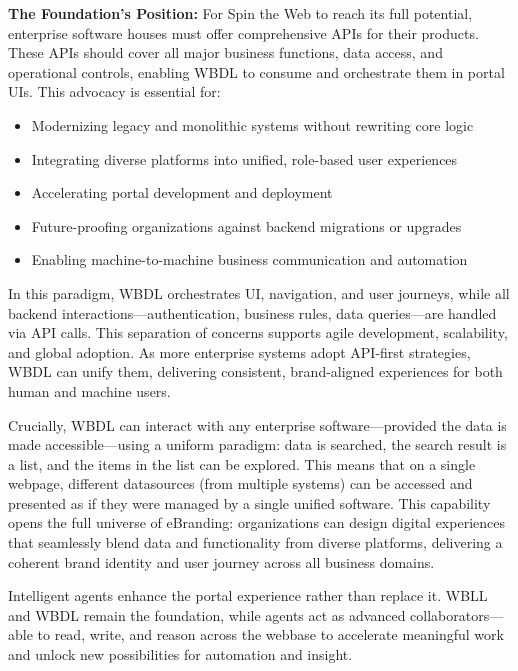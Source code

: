\textbf{The Foundation's Position:} For Spin the Web to reach its full potential, enterprise software houses must offer comprehensive APIs for their products. These APIs should cover all major business functions, data access, and operational controls, enabling WBDL to consume and orchestrate them in portal UIs. This advocacy is essential for:
\begin{itemize}
	\item Modernizing legacy and monolithic systems without rewriting core logic
	\item Integrating diverse platforms into unified, role-based user experiences
	\item Accelerating portal development and deployment
	\item Future-proofing organizations against backend migrations or upgrades
	\item Enabling machine-to-machine business communication and automation
\end{itemize}

In this paradigm, WBDL orchestrates UI, navigation, and user journeys, while all backend interactions—authentication, business rules, data queries—are handled via API calls. This separation of concerns supports agile development, scalability, and global adoption. As more enterprise systems adopt API-first strategies, WBDL can unify them, delivering consistent, brand-aligned experiences for both human and machine users.

Crucially, WBDL can interact with any enterprise software—provided the data is made accessible—using a uniform paradigm: data is searched, the search result is a list, and the items in the list can be explored. This means that on a single webpage, different datasources (from multiple systems) can be accessed and presented as if they were managed by a single unified software. This capability opens the full universe of eBranding: organizations can design digital experiences that seamlessly blend data and functionality from diverse platforms, delivering a coherent brand identity and user journey across all business domains.

Intelligent agents enhance the portal experience rather than replace it. WBLL and WBDL remain the foundation, while agents act as advanced collaborators—able to read, write, and reason across the webbase to accelerate meaningful work and unlock new possibilities for automation and insight.
